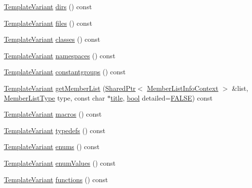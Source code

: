 \begin{DoxyCompactItemize}
\item 
\hyperlink{class_template_variant}{Template\+Variant} \hyperlink{class_module_context_1_1_private_a19dd2d5f70867708d2731b431e888fd2}{dirs} () const 
\item 
\hyperlink{class_template_variant}{Template\+Variant} \hyperlink{class_module_context_1_1_private_aa1465ee79751aaec56953245d93d899f}{files} () const 
\item 
\hyperlink{class_template_variant}{Template\+Variant} \hyperlink{class_module_context_1_1_private_a0c70fb4b2d1d87c9a494cf3b0cf05c09}{classes} () const 
\item 
\hyperlink{class_template_variant}{Template\+Variant} \hyperlink{class_module_context_1_1_private_a168124fc18bc91570a4f69c185e3dea0}{namespaces} () const 
\item 
\hyperlink{class_template_variant}{Template\+Variant} \hyperlink{class_module_context_1_1_private_ab8d5e6538709706e90c481178b8ba6cc}{constantgroups} () const 
\item 
\hyperlink{class_template_variant}{Template\+Variant} \hyperlink{class_module_context_1_1_private_aff6d402324a1bbfe77609cffef77570f}{get\+Member\+List} (\hyperlink{class_shared_ptr}{Shared\+Ptr}$<$ \hyperlink{class_member_list_info_context}{Member\+List\+Info\+Context} $>$ \&list, \hyperlink{types_8h_abe8ad5992f8938a28f918f51b199aa19}{Member\+List\+Type} type, const char $\ast$\hyperlink{class_module_context_1_1_private_a9a61bbe49df34c9d6f6a18426485e192}{title}, \hyperlink{qglobal_8h_a1062901a7428fdd9c7f180f5e01ea056}{bool} detailed=\hyperlink{qglobal_8h_a10e004b6916e78ff4ea8379be80b80cc}{F\+A\+L\+S\+E}) const 
\item 
\hyperlink{class_template_variant}{Template\+Variant} \hyperlink{class_module_context_1_1_private_a34914341385a7f611ee830ab90eab488}{macros} () const 
\item 
\hyperlink{class_template_variant}{Template\+Variant} \hyperlink{class_module_context_1_1_private_a2134684846b1682844f9dd9146ec2265}{typedefs} () const 
\item 
\hyperlink{class_template_variant}{Template\+Variant} \hyperlink{class_module_context_1_1_private_a70ddcf73b28dfdc122b86375639e9df5}{enums} () const 
\item 
\hyperlink{class_template_variant}{Template\+Variant} \hyperlink{class_module_context_1_1_private_a67a45229880ca3042fec1e9ce56b91c3}{enum\+Values} () const 
\item 
\hyperlink{class_template_variant}{Template\+Variant} \hyperlink{class_module_context_1_1_private_a194d8cd94b4c54db13e744ad97323676}{functions} () const 

\end{DoxyCompactItemize}
